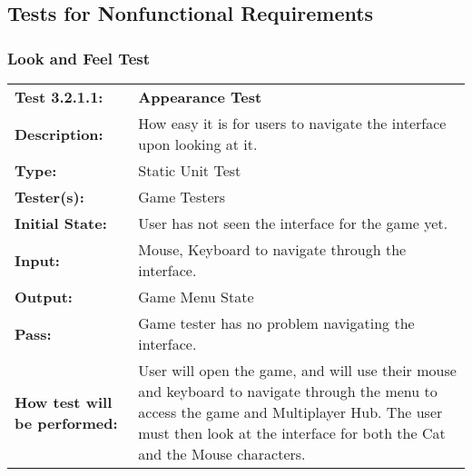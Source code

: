 \documentclass[12pt, titlepage]{article}
\begin{document}
\subsection{Tests for Nonfunctional Requirements}
\subsubsection{Look and Feel Test}

\begin{mdframed}[linewidth=1pt]
\begin{tabularx}{\textwidth}{@{}p{3cm}X@{}}
{\bf Test 3.2.1.1:} & {\bf Appearance Test}\\[\baselineskip]
{\bf Description:} & How easy it is for users to navigate the interface upon looking at it.\\[0.5\baselineskip]
{\bf Type:} & Static Unit Test\\[0.5\baselineskip]
{\bf Tester(s):} & Game Testers\\[0.5\baselineskip]
{\bf Initial State:} & User has not seen the interface for the game yet.\\[0.5\baselineskip]
{\bf Input:} & Mouse, Keyboard to navigate through the interface.\\[0.5\baselineskip]
{\bf Output:} & Game Menu State\\[0.5\baselineskip]
{\bf Pass:} & Game tester has no problem navigating the interface.\\[0.5\baselineskip]
{\bf How test will be performed:} & User will open the game, and will use their mouse and keyboard to navigate through the menu to access the game and Multiplayer Hub. The user must then look at the interface for both the Cat and the Mouse characters.
\end{tabularx}
\end{mdframed}

\newpage
\end{document}
